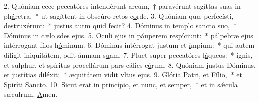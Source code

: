 2. Quóniam ecce peccatóres intendérunt arcum,~† paravérunt sagíttas suas in ph\uline{á}retra,~* ut sagíttent in obscúro rctos c\uline{o}rde.
3. Quóniam quæ perfecísti, destrux\uline{é}runt:~* justus autm quid f\uline{e}cit?
4. Dóminus in templo sancto s\uline{u}o,~* Dóminus in cælo sdes \uline{e}jus.
5. Oculi ejus in páuperem resp\uline{í}ciunt:~* pálpebræ ejus intérrogant fílos h\uline{ó}minum.
6. Dóminus intérrogat justum et \uline{í}mpium:~* qui autem díligit iniquitátem, odit ánmam s\uline{u}am.
7. Pluet super peccatóres l\uline{á}queos:~* ignis, et sulphur, et spíritus procellárum pars cálics e\uline{ó}rum.
8. Quóniam justus Dóminus, et justítias dil\uline{é}xit:~* æquitátem vidit vltus \uline{e}jus.
9. Glória Patri, et F\uline{í}lio,~* et Spiríti S\uline{a}ncto.
10. Sicut erat in princípio, et nunc, et s\uline{e}mper,~* et in sǽcula sæculrum. \uline{A}men.
